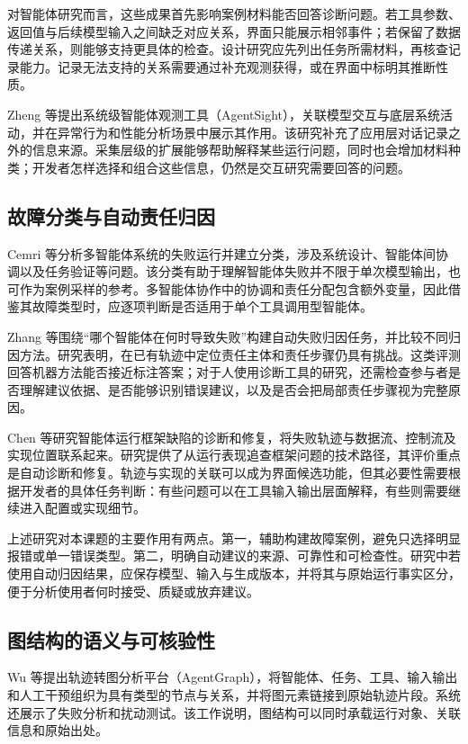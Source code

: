 对智能体研究而言，这些成果首先影响案例材料能否回答诊断问题。若工具参数、返回值与后续模型输入之间缺乏对应关系，界面只能展示相邻事件；若保留了数据传递关系，则能够支持更具体的检查。设计研究应先列出任务所需材料，再核查记录能力。记录无法支持的关系需要通过补充观测获得，或在界面中标明其推断性质。

Zheng 等\cite{ref19}提出系统级智能体观测工具（AgentSight），关联模型交互与底层系统活动，并在异常行为和性能分析场景中展示其作用。该研究补充了应用层对话记录之外的信息来源。采集层级的扩展能够帮助解释某些运行问题，同时也会增加材料种类；开发者怎样选择和组合这些信息，仍然是交互研究需要回答的问题。

\subsection{故障分类与自动责任归因}

Cemri 等\cite{cemri2025mast}分析多智能体系统的失败运行并建立分类，涉及系统设计、智能体间协调以及任务验证等问题。该分类有助于理解智能体失败并不限于单次模型输出，也可作为案例采样的参考。多智能体协作中的协调和责任分配包含额外变量，因此借鉴其故障类型时，应逐项判断是否适用于单个工具调用型智能体。

Zhang 等\cite{ref03}围绕“哪个智能体在何时导致失败”构建自动失败归因任务，并比较不同归因方法。研究表明，在已有轨迹中定位责任主体和责任步骤仍具有挑战。这类评测回答机器方法能否接近标注答案；对于人使用诊断工具的研究，还需检查参与者是否理解建议依据、是否能够识别错误建议，以及是否会把局部责任步骤视为完整原因。

Chen 等\cite{ref20}研究智能体运行框架缺陷的诊断和修复，将失败轨迹与数据流、控制流及实现位置联系起来。研究提供了从运行表现追查框架问题的技术路径，其评价重点是自动诊断和修复。轨迹与实现的关联可以成为界面候选功能，但其必要性需要根据开发者的具体任务判断：有些问题可以在工具输入输出层面解释，有些则需要继续进入配置或实现细节。

上述研究对本课题的主要作用有两点。第一，辅助构建故障案例，避免只选择明显报错或单一错误类型。第二，明确自动建议的来源、可靠性和可检查性。研究中若使用自动归因结果，应保存模型、输入与生成版本，并将其与原始运行事实区分，便于分析使用者何时接受、质疑或放弃建议。

\subsection{图结构的语义与可核验性}

Wu 等\cite{ref23}提出轨迹转图分析平台（AgentGraph），将智能体、任务、工具、输入输出和人工干预组织为具有类型的节点与关系，并将图元素链接到原始轨迹片段。系统还展示了失败分析和扰动测试。该工作说明，图结构可以同时承载运行对象、关联信息和原始出处。

